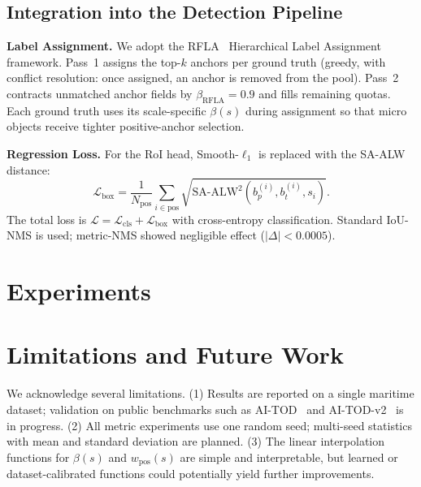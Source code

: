 \documentclass[runningheads]{llncs}
\newcommand{\saalwsq}{\text{SA-ALW}^2}
\begin{document}
\subsection{Integration into the Detection Pipeline}

\textbf{Label Assignment.} We adopt the RFLA~\cite{xu2022rfla} Hierarchical
Label Assignment framework. Pass~1 assigns the top-$k$ anchors per ground
truth (greedy, with conflict resolution: once assigned, an anchor is removed
from the pool). Pass~2 contracts unmatched anchor fields by
$\beta_{\text{RFLA}}=0.9$ and fills remaining quotas. Each ground truth uses
its scale-specific $\beta(s)$ during assignment so that micro objects
receive tighter positive-anchor selection.

\textbf{Regression Loss.} For the RoI head, Smooth-$\ell_1$ is replaced with
the SA-ALW distance:
\begin{equation}
\mathcal{L}_{\text{box}} = \frac{1}{N_{\text{pos}}}\sum_{i\in\text{pos}}
       \sqrt{\saalwsq(b_p^{(i)}, b_t^{(i)}, s_i)}.
\label{eq:loss}
\end{equation}
The total loss is $\mathcal{L}=\mathcal{L}_{\text{cls}}+\mathcal{L}_{\text{box}}$
with cross-entropy classification. Standard IoU-NMS is used; metric-NMS
showed negligible effect ($|\Delta|<0.0005$).

\section{Experiments}
\label{sec:exp}


\section{Limitations and Future Work}
\label{sec:limitations}

We acknowledge several limitations.
(1) Results are reported on a single maritime dataset; validation on public
benchmarks such as AI-TOD~\cite{wang2021aitod} and
AI-TOD-v2~\cite{xu2022aitodv2nwd} is in progress.
(2) All metric experiments use one random seed; multi-seed statistics with
mean and standard deviation are planned.
(3) The linear interpolation functions for $\beta(s)$ and $w_{\text{pos}}(s)$
are simple and interpretable, but learned or dataset-calibrated functions
could potentially yield further improvements.
\end{document}
